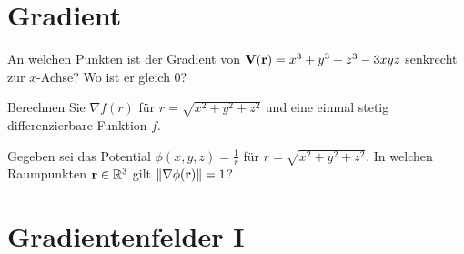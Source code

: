 \documentclass{scrartcl}
\begin{document}
\maketitle

\section{Gradient }
\label{sec:gradient}

\begin{subex}
  \item{} An welchen Punkten ist der Gradient von $\mathbf{V}(\mathbf{r}) = x^3 + y^3 + z^3 - 3xyz$ senkrecht zur $x$-Achse?
  Wo ist er gleich 0?
  \item{} Berechnen Sie $\nabla f(r)$ für $r = \sqrt{x^2 + y^2 + z^2}$ und eine einmal stetig differenzierbare Funktion $f$.
  \item{} Gegeben sei das Potential $\phi(x, y, z) = \frac{1}{r}$ für $r = \sqrt{x^2 + y^2 + z^2}$. In welchen Raumpunkten $\mathbf{r} \in \mathbb{R}^3$ gilt $\Vert \nabla \phi (\mathbf{r}) \Vert = 1$?
\end{subex}

\section{Gradientenfelder I }
\label{sec:gradientenfelder1}
\end{document}

